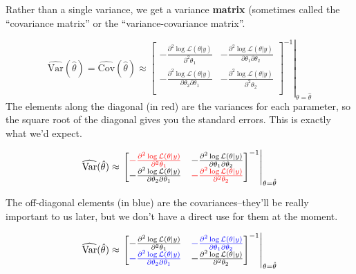 \documentclass[
]{book}
\begin{document}
Rather than a single variance, we get a variance \textbf{matrix} (sometimes called the ``covariance matrix'' or the ``variance-covariance matrix''.

\[
\begin{equation*}
\widehat{\text{Var}}(\hat{\theta})= \widehat{\text{Cov}}(\hat{\theta}) \approx \left. \left[ 
\displaystyle \begin{matrix}
- \frac{\partial^2 \log \mathcal{L}(\theta| y)}{\partial^2 \theta_1} & - \frac{\partial^2 \log \mathcal{L}(\theta| y)}{\partial \theta_1 \partial \theta_2}\\
- \frac{\partial^2 \log \mathcal{L}(\theta| y)}{\partial \theta_2 \partial \theta_1} & - \frac{\partial^2 \log \mathcal{L}(\theta| y)}{\partial^2 \theta_2}\\
\end{matrix}\right]^{-1} \right|_{\theta = \hat{\theta}}
\end{equation*}
\]
The elements along the diagonal (in red) are the variances for each parameter, so the square root of the diagonal gives you the standard errors. This is exactly what we'd expect.

\[
\begin{equation*}
\widehat{\text{Var}}(\hat{\theta}) \approx \left. \left[ 
\displaystyle \begin{matrix}
\color{red}{- \frac{\partial^2 \log \mathcal{L}(\theta| y)}{\partial^2 \theta_1}} & - \frac{\partial^2 \log \mathcal{L}(\theta| y)}{\partial \theta_1 \partial \theta_2}\\
- \frac{\partial^2 \log \mathcal{L}(\theta| y)}{\partial \theta_2 \partial \theta_1} & \color{red}{- \frac{\partial^2 \log \mathcal{L}(\theta| y)}{\partial^2 \theta_2}}\\
\end{matrix}\right]^{-1} \right|_{\theta = \hat{\theta}}
\end{equation*}
\]

The off-diagonal elements (in blue) are the covariances--they'll be really important to us later, but we don't have a direct use for them at the moment.

\[
\begin{equation*}
\widehat{\text{Var}}(\hat{\theta}) \approx \left. \left[ 
\displaystyle \begin{matrix}
- \frac{\partial^2 \log \mathcal{L}(\theta| y)}{\partial^2 \theta_1} & \color{blue}{- \frac{\partial^2 \log \mathcal{L}(\theta| y)}{\partial \theta_1 \partial \theta_2}}\\
\color{blue}{- \frac{\partial^2 \log \mathcal{L}(\theta| y)}{\partial \theta_2 \partial \theta_1}} & - \frac{\partial^2 \log \mathcal{L}(\theta| y)}{\partial^2 \theta_2}\\
\end{matrix}\right]^{-1} \right|_{\theta = \hat{\theta}}
\end{equation*}
\]
\end{document}
